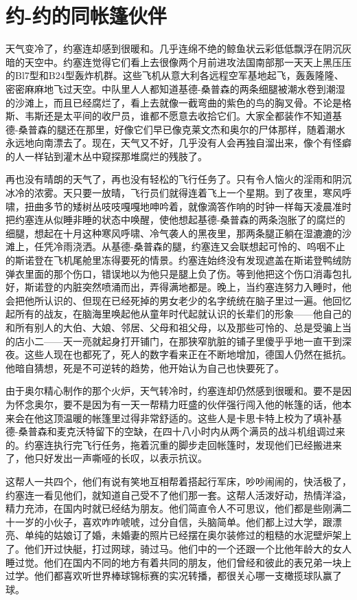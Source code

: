 \chapter{约-约的同帐篷伙伴}
 
    天气变冷了，约塞连却感到很暖和。几乎连绵不绝的鲸鱼状云彩低低飘浮在阴沉灰暗的天空中。约塞连觉得它们看上去很像两个月前进攻法国南部那一天天上黑压压的Bl7型和B24型轰炸机群。这些飞机从意大利各远程空军基地起飞，轰轰隆隆、密密麻麻地飞过天空。中队里人人都知道基德-桑普森的两条细腿被潮水卷到潮湿的沙滩上，而且已经腐烂了，看上去就像一截弯曲的紫色的鸟的胸叉骨。不论是格斯、韦斯还是太平间的收尸员，谁都不愿意去收拾它们。大家全都装作不知道基德-桑普森的腿还在那里，好像它们早已像克莱文杰和奥尔的尸体那样，随着潮水永远地向南漂去了。现在，天气又不好，几乎没有人会再独自溜出来，像个有怪癖的人一样钻到灌木丛中窥探那堆腐烂的残肢了。

    再也没有晴朗的天气了，再也没有轻松的飞行任务了。只有令人恼火的淫雨和阴沉冰冷的浓雾。天只要一放晴，飞行员们就得连着飞上一个星期。到了夜里，寒风呼啸，扭曲多节的矮树丛吱吱嘎嘎地呻吟着，就像滴答作响的时钟一样每天凌晨准时把约塞连从似睡非睡的状态中唤醒，使他想起基德-桑普森的两条泡胀了的腐烂的细腿，想起在十月这种寒风呼啸、冷气袭人的黑夜里，那两条腿正躺在湿漉漉的沙滩上，任凭冷雨浇洒。从基德-桑普森的腿，约塞连又会联想起可怜的、呜咽不止的斯诺登在飞机尾舱里冻得要死的情景。约塞连始终没有发现遮盖在斯诺登鸭绒防弹衣里面的那个伤口，错误地以为他只是腿上负了伤。等到他把这个伤口消毒包扎好，斯诺登的内脏突然喷涌而出，弄得满地都是。晚上，当约塞连努力入睡时，他会把他所认识的、但现在已经死掉的男女老少的名字统统在脑子里过一遍。他回忆起所有的战友，在脑海里唤起他从童年时代起就认识的长辈们的形象——他自己的和所有别人的大伯、大娘、邻居、父母和祖父母，以及那些可怜的、总是受骗上当的店小二——天一亮就起身打开铺门，在那狭窄肮脏的铺子里傻乎乎地一直干到深夜。这些人现在也都死了，死人的数字看来正在不断地增加，德国人仍然在抵抗。他暗自猜想，死是不可逆转的趋势，他开始认为自己也快要死了。

    由于奥尔精心制作的那个火炉，天气转冷时，约塞连却仍然感到很暖和。要不是因为怀念奥尔，要不是因为有一天一帮精力旺盛的伙伴强行闯入他的帐篷的话，他本来会在他这顶温暖的帐篷里过得非常舒适的。这些人是卡思卡特上校为了填补基德-桑普森和麦克沃特留下的空缺，在四十八小时内从两个满员的战斗机组调过来的。约塞连执行完飞行任务，拖着沉重的脚步走回帐篷时，发现他们已经搬进来了，他只好发出一声嘶哑的长叹，以表示抗议。

    这帮人一共四个，他们有说有笑地互相帮着搭起行军床，吵吵闹闹的，快活极了，约塞连一看见他们，就知道自己受不了他们那一套。这帮人活泼好动，热情洋溢，精力充沛，在国内时就已经结为朋友。他们简直令人不可思议，他们都是些刚满二十一岁的小伙子，喜欢咋咋唬唬，过分自信，头脑简单。他们都上过大学，跟漂亮、单纯的姑娘订了婚，未婚妻的照片已经摆在奥尔装修过的粗糙的水泥壁炉架上了。他们开过快艇，打过网球，骑过马。他们中的一个还跟一个比他年龄大的女人睡过觉。他们在国内不同的地方有着共同的朋友，他们曾经和彼此的表兄弟一块上过学。他们都喜欢听世界棒球锦标赛的实况转播，都很关心哪一支橄揽球队赢了球。

